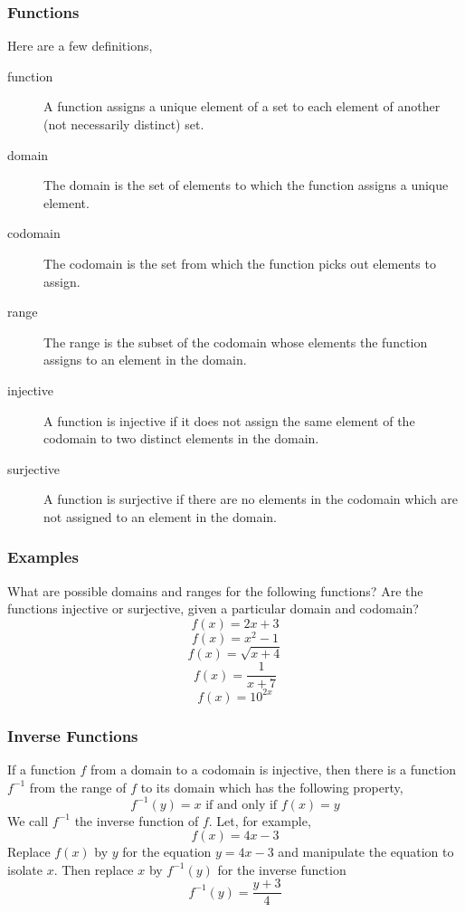 \documentclass[xcolor=dvipsnames]{beamer}
\begin{document}
\begin{frame}
  \frametitle{Functions}
Here are a few definitions,
\begin{description}
\item[function] A function assigns a unique element of a set to each
  element of another (not necessarily distinct) set.
\item[domain] The domain is the set of elements to which the function
  assigns a unique element.
\item[codomain] The codomain is the set from which the function picks
  out elements to assign.
\item[range] The range is the subset of the codomain whose elements
  the function assigns to an element in the domain.
\item[injective] A function is injective if it does not assign the
  same element of the codomain to two distinct elements in the domain.
\item[surjective] A function is surjective if there are no elements in
  the codomain which are not assigned to an element in the domain.
\end{description}
\end{frame}

\begin{frame}
  \frametitle{Examples}
What are possible domains and ranges for the following functions? Are
the functions injective or surjective, given a particular domain and
codomain?
\begin{equation}
  \label{eq:rebiejie}
  f(x)=2x+3
\end{equation}
\begin{equation}
  \label{eq:ebaivuim}
  f(x)=x^{2}-1
\end{equation}
\begin{equation}
  \label{eq:ichievae}
  f(x)=\sqrt{x+4}
\end{equation}
\begin{equation}
  \label{eq:ejawache}
  f(x)=\frac{1}{x+7}
\end{equation}
\begin{equation}
  \label{eq:tohjuogi}
  f(x)=10^{2x}
\end{equation}
\end{frame}

\begin{frame}
  \frametitle{Inverse Functions}
If a function $f$ from a domain to a codomain is injective, then there
is a function $f^{-1}$ from the range of $f$ to its domain which has
the following property,
\begin{equation}
  \label{eq:noexiedi}
  f^{-1}(y)=x\mbox{ if and only if }f(x)=y
\end{equation}
We call $f^{-1}$ the \alert{inverse function} of $f$. Let, for
example,
\begin{equation}
  \label{eq:iengaihu}
  f(x)=4x-3
\end{equation}
Replace $f(x)$ by $y$ for the equation $y=4x-3$ and manipulate the
equation to isolate $x$. Then replace $x$ by $f^{-1}(y)$ for the
inverse function
\begin{equation}
  \label{eq:eimoofie}
  f^{-1}(y)=\frac{y+3}{4}
\end{equation}
\end{frame}
\end{document}

